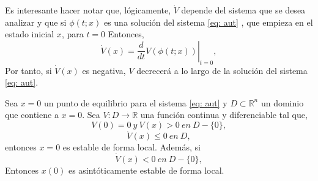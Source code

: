 Es interesante hacer notar que, lógicamente, $\dot V$ depende del sistema que se desea analizar y que si $\phi(t;x)$ es una solución del sistema \ref{eq: aut} , que empieza  en el estado inicial $x$, para $t=0$ Entonces,
\begin{equation}
\dot V(x) =\left. \frac{d}{dt}V(\phi (t;x))\right|_{t=0},
\end{equation}
Por tanto, si $\dot V(x)$ es negativa, $V$ decrecerá a lo largo de la solución del sistema \ref{eq: aut}.

\begin{theorem}\label{thm: lyap1}
Sea $x=0$ un punto de equilibrio para el sistema \ref{eq: aut} y $D \subset \mathbb{R}^n$ un dominio que contiene a $x=0$. Sea $V:D 	\to \mathbb{R}$ una función continua y diferenciable tal que,
\begin{equation}\label{eq: lyap1}
V(0) = 0\ y\ V(x) > 0\ en\  D-\{0\},
\end{equation}
\begin{equation}\label{eq: lyap2}
\dot V(x) \leq 0\ en\ D,
\end{equation} 
entonces $x=0$ es estable de forma local. Además, si
\begin{equation}\label{eq: lyap3}
\dot V(x) < 0 \ en\ D-\{0\},
\end{equation} 
Entonces $x(0)$ es asintóticamente estable de forma local.
\end{theorem}
